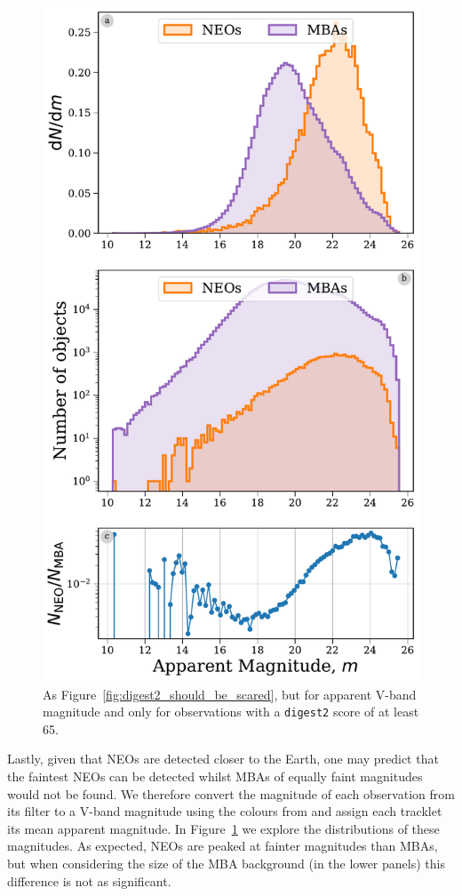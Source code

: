 \documentclass[twocolumn, twocolappendix]{aastex631}
\newcommand{\dig}{\texttt{digest2}}
\begin{document}
\begin{figure}[htb]
    \centering
    \includegraphics[width=\columnwidth]{figures/apparent_mag_dist_highscore.pdf}
    \caption{As Figure~\ref{fig:digest2_should_be_scared}, but for apparent V-band magnitude and only for observations with a \dig{} score of at least 65.}
    \label{fig:app_mag_highscore}
\end{figure}

Lastly, given that NEOs are detected closer to the Earth, one may predict that the faintest NEOs can be detected whilst MBAs of equally faint magnitudes would not be found. We therefore convert the magnitude of each observation from its filter to a V-band magnitude using the colours from \citet{Jones+2018} and assign each tracklet its mean apparent magnitude. In Figure~\ref{fig:app_mag_highscore} we explore the distributions of these magnitudes. As expected, NEOs are peaked at fainter magnitudes than MBAs, but when considering the size of the MBA background (in the lower panels) this difference is not as significant.
\end{document}

